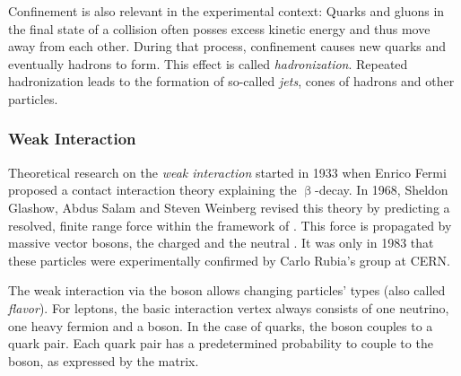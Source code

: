 Confinement is also relevant in the experimental context: Quarks and gluons in the final state of a collision often posses excess kinetic energy and thus move away from each other. During that process, confinement causes new quarks and eventually hadrons to form. This effect is called \emph{hadronization}. Repeated hadronization leads to the formation of so-called \emph{jets}, cones of hadrons and other particles.


\subsubsection{Weak Interaction}
Theoretical research on the \emph{weak interaction} started in 1933 when Enrico Fermi proposed a contact interaction theory explaining the $\upbeta$-decay\cite{Fermi:Tentativodiuna}. 
In 1968, Sheldon Glashow, Abdus Salam and Steven Weinberg revised this theory by predicting a resolved, finite range force within the framework of \cite{Glashow:PartialSymmetriesWeak,Weinberg:modelleptons,Salam:WeakElectromagneticInteractions}. This force is propagated by  massive vector bosons, the charged \PWpm and the neutral \PZ. It was only in 1983 that these particles were experimentally confirmed by Carlo Rubia's group at \acs{CERN}\cite{Arnison:ExperimentalObservationIsolated,Arnison:Experimentalobservationlepton}.

The weak interaction via the \PW boson allows changing particles' types (also called \emph{flavor}). For leptons, the basic interaction vertex always consists of one neutrino, one heavy fermion and a \PW boson. In the case of quarks, the \PW boson couples to a quark pair. Each quark pair has a predetermined probability to couple to the \PW boson, as expressed by the  matrix\cite{Kobayashi:CPViolationRenormalizable}.

